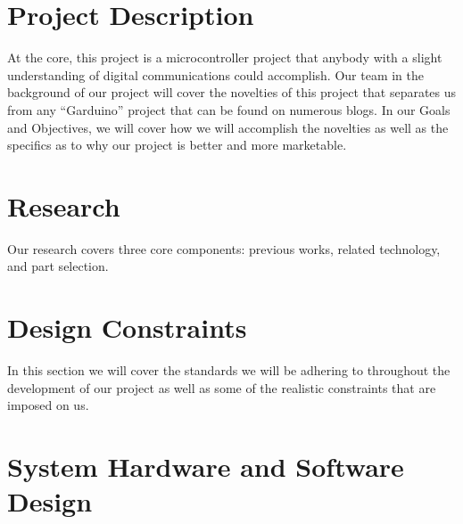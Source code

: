 \documentclass[12pt]{article}
\begin{document}
\section{Project Description}                   %
At the core, this project is a microcontroller project that anybody with a slight understanding of digital communications could accomplish. Our team in the background of our project will cover the novelties of this project that separates us from any ``Garduino'' project that can be found on numerous blogs. In our Goals and Objectives, we will cover how we will accomplish the novelties as well as the specifics as to why our project is better and more marketable.
\section{Research}                              %
Our research covers three core components: previous works, related technology, and part selection. 
\section{Design Constraints}                    %
In this section we will cover the standards we will be adhering to throughout the development of our project as well as some of the realistic constraints that are imposed on us.
\section{System Hardware and Software Design}   %
\end{document}
